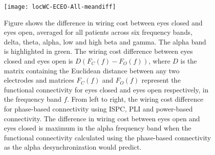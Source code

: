 \documentclass[11pt, onecolumn]{article}
\begin{document}

\begin{figure}[h]
        \centering
        \texttt{[image: locWC-ECEO-All-meandiff]}
        \caption{Figure shows the difference in wiring cost between eyes closed and eyes open, averaged for all patients across six frequency bands, delta, theta, alpha, low and high beta and gamma. The alpha band is highlighted in green. The wiring cost difference between eyes closed and eyes open is ${D}(F_C(f)- F_O(f))$, where $D$ is the matrix containing the Euclidean distance between any two electrodes and matrices $F_C(f)$ and $F_O(f)$ represent the functional connectivity for eyes closed and eyes open respectively, in the frequency band $f$. From left to right, the wiring cost difference for phase-based connectivity using ISPC, PLI and power-based connectivity. The difference in wiring cost between eyes open and eyes closed is maximum in the alpha frequency band when the functional connectivity calculated using the phase-based connectivity as the alpha desynchronization would predict.}
\label{fig:figi-1}
\end{figure}
 
\end{document}
